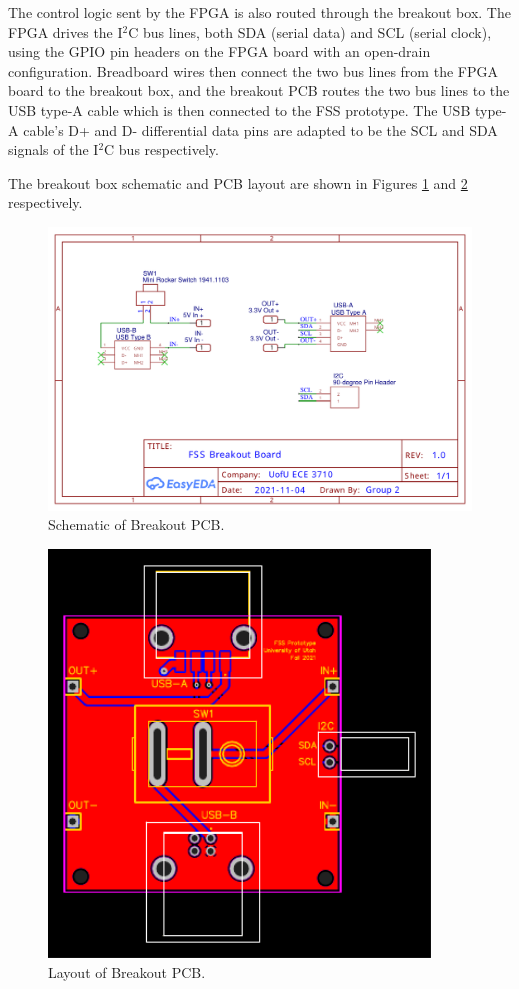 \documentclass[conference]{IEEEtran}
\begin{document}
The control logic sent by the FPGA is also routed through the breakout box. The FPGA drives the I$^2$C bus lines, both SDA (serial data) and SCL (serial clock), using the GPIO pin headers on the FPGA board with an open-drain configuration. Breadboard wires then connect the two bus lines from the FPGA board to the breakout box, and the breakout PCB routes the two bus lines to the USB type-A cable which is then connected to the FSS prototype. The USB type-A cable's D+ and D- differential data pins are adapted to be the SCL and SDA signals of the I$^2$C bus respectively.

The breakout box schematic and PCB layout are shown in Figures \ref{fig:breakout_schematic} and \ref{fig:breakout_pcb} respectively.

\begin{figure}[bhtp]
    \centering
    \includegraphics[width=4.5in]{./resources/figures/breakout_schematic.pdf}
    \caption{Schematic of Breakout PCB.}
    \label{fig:breakout_schematic}
\end{figure}

\begin{figure}[bhtp]
    \centering
    \includegraphics[width=4in]{./resources/figures/breakout_pcb.pdf}
    \caption{Layout of Breakout PCB.}
    \label{fig:breakout_pcb}
\end{figure}
\end{document}
